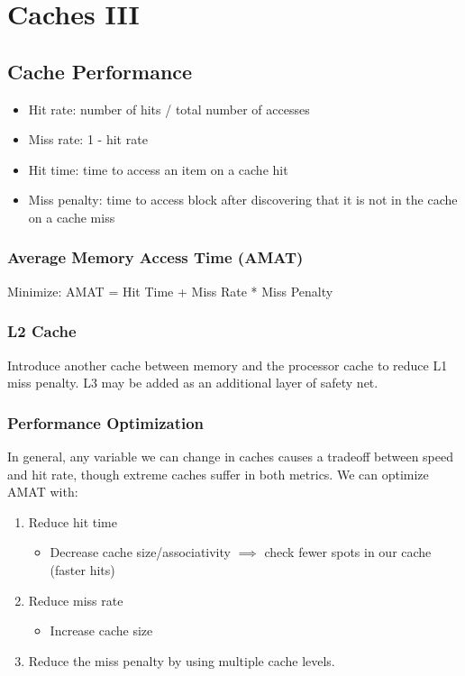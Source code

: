 \chapter{Caches III}

\section{Cache Performance}
\begin{itemize}
    \item Hit rate: number of hits / total number of accesses
    \item Miss rate: 1 - hit rate
    \item Hit time: time to access an item on a cache hit
    \item Miss penalty: time to access block after discovering that it is not in the cache on a cache miss
\end{itemize}

\subsection{Average Memory Access Time (AMAT)}
Minimize: AMAT = Hit Time + Miss Rate * Miss Penalty

\subsection{L2 Cache}
Introduce another cache between memory and the processor cache to reduce L1 miss penalty. L3 may be added as an additional layer of safety net.

\subsection{Performance Optimization}
In general, any variable we can change in caches causes a tradeoff between speed and hit rate, though extreme caches suffer in both metrics. We can optimize AMAT with:
\begin{enumerate}
	\item Reduce hit time
	\begin{itemize}
	    \item Decrease cache size/associativity $\implies$ check fewer spots in our cache (faster hits)
	\end{itemize}
	\item Reduce miss rate
	\begin{itemize}
	    \item Increase cache size
	\end{itemize}
	\item Reduce the miss penalty by using multiple cache levels.
\end{enumerate}

